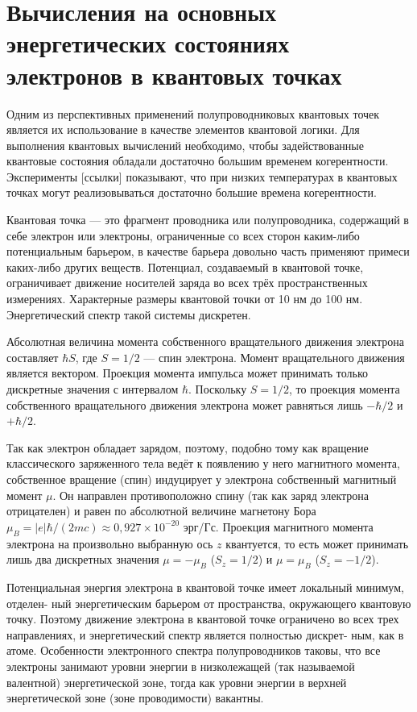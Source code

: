\documentclass[14pt]{article}
\begin{document}
\thispagestyle{empty}

\section{Вычисления на основных энергетических состояниях электронов в квантовых точках}

Одним из перспективных применений полупроводниковых квантовых точек
является их использование в качестве элементов квантовой логики. Для выполнения
квантовых вычислений необходимо, чтобы задействованные квантовые состояния
обладали достаточно большим временем когерентности. Эксперименты [ссылки]
показывают, что при низких температурах в квантовых точках могут реализовываться
достаточно большие времена когерентности.

Квантовая точка --- это фрагмент проводника или полупроводника, содержащий в себе электрон или электроны, ограниченные со всех сторон каким-либо потенциальным барьером, в качестве барьера довольно часть применяют примеси каких-либо других веществ. Потенциал, создаваемый в квантовой точке,
ограничивает движение носителей заряда во всех трёх пространственных измерениях. Характерные размеры квантовой точки от 10 нм до 100 нм. Энергетический спектр такой системы дискретен.


Абсолютная величина момента собственного вращательного движения электрона составляет $\hbar S$, где $S = 1/2$ --- спин электрона. Момент вращательного движения является вектором. Проекция момента импульса может принимать только дискретные значения с интервалом $\hbar$. Поскольку $S=1/2$, то проекция момента собственного вращательного движения электрона может равняться лишь $-\hbar/2$ и $+\hbar/2$. 
 	
 

Так как электрон обладает зарядом, поэтому, подобно тому как вращение классического заряженного тела ведёт к появлению у него магнитного момента, собственное вращение (спин) индуцирует у электрона собственный магнитный момент $\mu$. Он направлен противоположно спину (так как заряд электрона отрицателен) и равен по абсолютной величине магнетону Бора $\mu_{B} = |e|\hbar/(2mc) \approx 0,927 \times 10^{-20}$ эрг/Гс. Проекция магнитного момента электрона на произвольно выбранную ось $z$ квантуется, то есть может принимать лишь два дискретных значения $\mu = -\mu_{B}$ ($S_{z} = 1/2$) и $\mu = \mu_{B}$ ($S_{z} = -1/2$).

Потенциальная энергия электрона в квантовой точке имеет локальный минимум, отделен-
ный энергетическим барьером от пространства, окружающего квантовую точку. Поэтому движение электрона в
квантовой точке ограничено во всех трех направлениях, и энергетический спектр является полностью дискрет-
ным, как в атоме.  Особенности электронного спектра полупроводников таковы, что все электроны занимают уровни энергии в низколежащей (так называемой валентной) энергетической зоне, тогда как уровни энергии в верхней энергетической зоне (зоне проводимости) вакантны.
\end{document}
